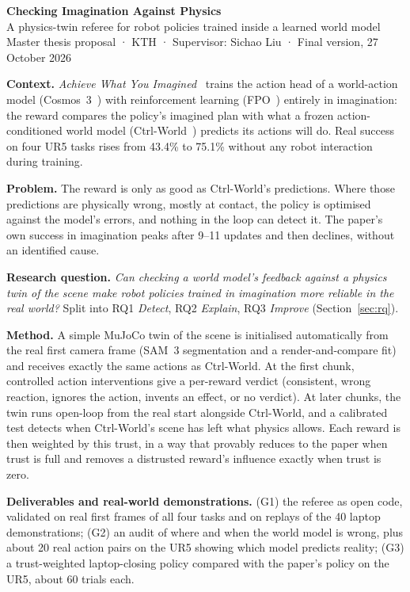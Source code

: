 \documentclass[11pt,a4paper]{article}
\theoremstyle{plain}
\theoremstyle{definition}
\theoremstyle{remark}
\begin{document}
\begin{center}
{\LARGE\bfseries\color{navy} Checking Imagination Against Physics}\\[6pt]
{\large\color{navy} A physics-twin referee for robot policies trained inside a learned world model}\\[8pt]
{\color{gray} Master thesis proposal · KTH · Supervisor: Sichao Liu · Final version, 27 October 2026}
\end{center}

\begin{keybox}[title={\textbf{The proposal in brief}},fonttitle=\color{white}\bfseries,colbacktitle=blue!60!black]
\textbf{Context.} \emph{Achieve What You Imagined}~\cite{a2a} trains the action head of a world-action model (Cosmos~3~\cite{cosmos3}) with reinforcement learning (FPO~\cite{fpo}) entirely in imagination: the reward compares the policy's imagined plan with what a frozen action-conditioned world model (Ctrl-World~\cite{ctrlworld}) predicts its actions will do. Real success on four UR5 tasks rises from 43.4\% to 75.1\% without any robot interaction during training.

\textbf{Problem.} The reward is only as good as Ctrl-World's predictions. Where those predictions are physically wrong, mostly at contact, the policy is optimised against the model's errors, and nothing in the loop can detect it. The paper's own success in imagination peaks after 9--11 updates and then declines, without an identified cause.

\textbf{Research question.} \emph{Can checking a world model's feedback against a physics twin of the scene make robot policies trained in imagination more reliable in the real world?} Split into RQ1 \emph{Detect}, RQ2 \emph{Explain}, RQ3 \emph{Improve} (Section~\ref{sec:rq}).

\textbf{Method.} A simple MuJoCo twin of the scene is initialised automatically from the real first camera frame (SAM~3 segmentation and a render-and-compare fit) and receives exactly the same actions as Ctrl-World. At the first chunk, controlled action interventions give a per-reward verdict (consistent, wrong reaction, ignores the action, invents an effect, or no verdict). At later chunks, the twin runs open-loop from the real start alongside Ctrl-World, and a calibrated test detects when Ctrl-World's scene has left what physics allows. Each reward is then weighted by this trust, in a way that provably reduces to the paper when trust is full and removes a distrusted reward's influence exactly when trust is zero.

\textbf{Deliverables and real-world demonstrations.} (G1) the referee as open code, validated on real first frames of all four tasks and on replays of the 40 laptop demonstrations; (G2) an audit of where and when the world model is wrong, plus about 20 real action pairs on the UR5 showing which model predicts reality; (G3) a trust-weighted laptop-closing policy compared with the paper's policy on the UR5, about 60 trials each.
\end{keybox}
\end{document}
